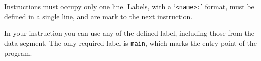 Instructions must occupy only one line. Labels, with a `\texttt{<name>:}' format, must be defined in a single line, and are mark to the next instruction.

In your instruction you can use any of the defined label, including those from the data segment. The only required label is \texttt{main}, which marks the entry point of the program.

